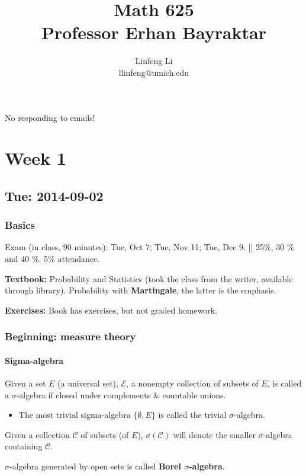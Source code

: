 \documentclass[11pt]{article}
\title{Math 625\\
Professor Erhan Bayraktar}
\author{Linfeng Li \\ llinfeng@umich.edu}
\begin{document}
\maketitle
No responding to emails!
\section{Week 1}
\subsection{Tue: 2014-09-02}
\subsubsection{Basics}
Exam (in class, 90 minutes): Tue, Oct 7; Tue, Nov 11; Tue, Dec 9.   || 25\%, 30
\% and 40 \%.  
5\% attendance. 


\textbf{Textbook: } Probability and Statistics (took the class from the writer,
available through library).  
Probability with \textbf{Martingale}, the latter is the emphasis.

\textbf{Exercises:} Book has exercises, but not graded homework.

\subsubsection{Beginning: measure theory}
\paragraph{Sigma-algebra}
Given a set $E$ (a universal set), $\mathcal E$, a nonempty collection of
subsets of $E$, is called a $\sigma$-algebra if closed under complements \&
countable unions. 

\begin{itemize}
  \item The most trivial sigma-algebra  $\{\emptyset, E\}$ is called the trivial
    $\sigma$-algebra. 
\end{itemize}

\begin{definition}
  Given a collection $\mathcal C$ of subsets (of $E$), $\sigma(\mathcal C)$ will
  denote the smaller $\sigma$-algebra containing $\mathcal C$. 
\end{definition}

\begin{definition}
  $\sigma$-algebra generated by open sets  is called \textbf{Borel
  $\sigma$-algebra}.
\end{definition}
\end{document}
